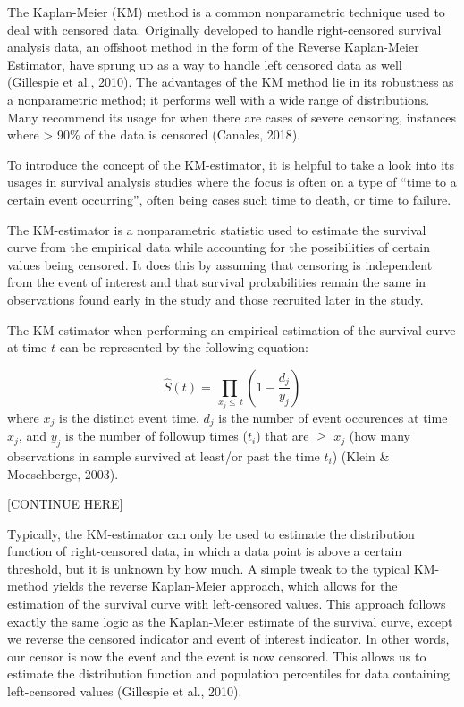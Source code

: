 \documentclass[12pt, twoside]{amherstthesis}
\begin{document}
The Kaplan-Meier (KM) method is a common nonparametric technique used to deal with censored data. Originally developed to handle right-censored survival analysis data, an offshoot method in the form of the Reverse Kaplan-Meier Estimator, have sprung up as a way to handle left censored data as well (Gillespie et al., 2010). The advantages of the KM method lie in its robustness as a nonparametric method; it performs well with a wide range of distributions. Many recommend its usage for when there are cases of severe censoring, instances where \textgreater{} 90\% of the data is censored (Canales, 2018).

To introduce the concept of the KM-estimator, it is helpful to take a look into its usages in survival analysis studies where the focus is often on a type of ``time to a certain event occurring'', often being cases such time to death, or time to failure.

The KM-estimator is a nonparametric statistic used to estimate the survival curve from the empirical data while accounting for the possibilities of certain values being censored. It does this by assuming that censoring is independent from the event of interest and that survival probabilities remain the same in observations found early in the study and those recruited later in the study.

The KM-estimator when performing an empirical estimation of the survival curve at time \(t\) can be represented by the following equation:

\[\hat{S}(t) = \prod_{\ x_j \le \ t }\left(1-\frac{d_j}{y_j}\right)\]
where \(x_j\) is the distinct event time, \(d_j\) is the number of event occurences at time \(x_j\), and \(y_j\) is the number of followup times (\(t_i\)) that are \(\ge\) \(x_j\) (how many observations in sample survived at least/or past the time \(t_i\)) (Klein \& Moeschberge, 2003).

{[}CONTINUE HERE{]}

Typically, the KM-estimator can only be used to estimate the distribution function of right-censored data, in which a data point is above a certain threshold, but it is unknown by how much. A simple tweak to the typical KM-method yields the reverse Kaplan-Meier approach, which allows for the estimation of the survival curve with left-censored values. This approach follows exactly the same logic as the Kaplan-Meier estimate of the survival curve, except we reverse the censored indicator and event of interest indicator. In other words, our censor is now the event and the event is now censored. This allows us to estimate the distribution function and population percentiles for data containing left-censored values (Gillespie et al., 2010).
\end{document}
